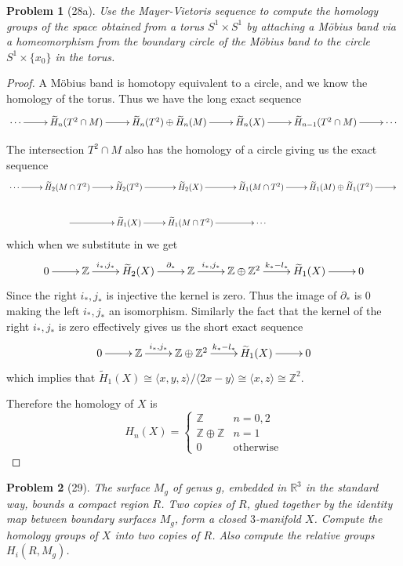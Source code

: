 \documentclass[10pt]{article}
\newcommand{\sk}{\vskip 10mm}
\newcommand{\bb}[1]{\mathbb{#1}}
\newcommand{\rH}{\widetilde{H}}
\theoremstyle{plain}
\newtheorem{problem}{Problem}
\theoremstyle{remark}
\begin{document}
\begin{problem}[28a]
  Use the Mayer-Vietoris sequence to compute the homology groups of the space
  obtained from a torus $S^1\times S^1$ by attaching a M\"obius band via a
  homeomorphism from the boundary circle of the M\"obius band to the
  circle $S^1\times \{ x_0\}$ in the torus. 
\end{problem}

\begin{proof}
  A M\"obius band is homotopy equivalent to a circle, and we know the homology
  of the torus. Thus we have the long exact sequence
  \[
    \xymatrix{
      \cdots \ar[r] & \rH_n(T^2\cap M) \ar[r] & \rH_n(T^2)\oplus \rH_n(M) \ar[r] & \rH_n(X) \ar[r] & \rH_{n-1}(T^2\cap M) \ar[r] & \cdots
    }
  \]

  The intersection $T^2\cap M$ also has the homology of a circle giving us the exact sequence
  \[
    \xymatrix{
      \cdots \ar[r] & \rH_2(M\cap T^2) \ar[r] & \rH_2(T^2) \ar[r] & \rH_2(X) \ar[r] & \rH_1(M\cap T^2) \ar[r] & \rH_1(M)\oplus\rH_1(T^2) \ar[r] & \\
      &\ar[r] & \rH_1(X) \ar[r] & \rH_1(M\cap T^2) \ar[r] & \cdots
    }
  \]
  which when we substitute in we get
  \[
    \xymatrix{
      0 \ar[r] & \bb{Z} \ar[r]^-{i_*,j_*} & \rH_2(X) \ar[r]^-{\partial_*} & \bb{Z} \ar[r]^-{i_*,j_*} & \bb{Z}\oplus\bb{Z}^2 \ar[r]^-{k_*-l_*} & \rH_1(X) \ar[r] & 0
    }
  \]
  Since the right $i_*,j_*$ is injective the kernel is zero. Thus the image of $\partial_*$
  is 0 making the left $i_*,j_*$ an isomorphism. Similarly the fact that the kernel
  of the right $i_*,j_*$ is zero effectively gives us the short exact sequence
  \[
    \xymatrix{
      0 \ar[r] & \bb{Z} \ar[r]^-{i_*,j_*} & \bb{Z}\oplus\bb{Z}^2 \ar[r]^-{k_*-l_*} & \rH_1(X) \ar[r] & 0
    }
  \]
  which implies that $\rH_1(X)\cong \langle x,y,z\rangle/\langle 2x-y\rangle\cong\langle x,z\rangle\cong\bb{Z}^2$.

  Therefore the homology of $X$ is
  \[
    H_n(X) =
    \left\{
      \begin{array}{cr}
        \bb{Z} & n=0,2\\
        \bb{Z}\oplus\bb{Z} & n=1\\
        0 & \text{otherwise}
      \end{array}
    \right.
  \]
  
\end{proof}

\sk

\begin{problem}[29]
  The surface $M_g$ of genus $g$, embedded in $\bb{R}^3$ in the standard way,
  bounds a compact region $R$. Two copies of $R$, glued together by the identity
  map between boundary surfaces $M_g$, form a closed $3$-manifold $X$.
  Compute the homology groups of $X$ into two copies of $R$. Also compute the
  relative groups $H_i(R,M_g)$.
\end{problem}
\end{document}

